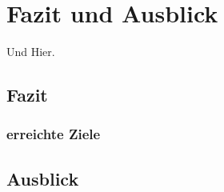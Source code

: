 \chapter{Fazit und Ausblick}
\label{cha:fazit}

Und Hier.\todo

\section{Fazit}
\label{sec:Schlussfolgerung}

\subsection{erreichte Ziele}
\label{subsec:erreichte_ziele}

\section{Ausblick}
\label{sec:Ausblick}
